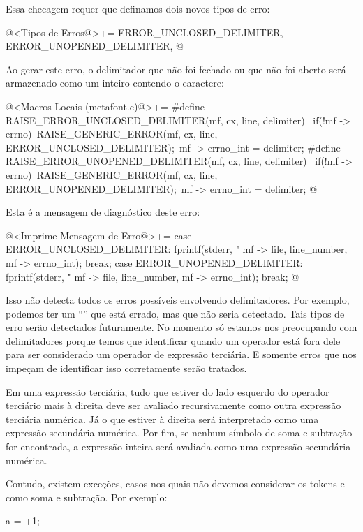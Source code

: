 Essa checagem requer que definamos dois novos tipos de erro:

\iniciocodigo
@<Tipos de Erros@>+=
ERROR_UNCLOSED_DELIMITER, ERROR_UNOPENED_DELIMITER,
@
\fimcodigo

Ao gerar este erro, o delimitador que não foi fechado ou que não foi
aberto será armazenado como um inteiro contendo o caractere:

\iniciocodigo
@<Macros Locais (metafont.c)@>+=
#define RAISE_ERROR_UNCLOSED_DELIMITER(mf, cx, line, delimiter) {\
  if(!mf -> errno){\
    RAISE_GENERIC_ERROR(mf, cx, line, ERROR_UNCLOSED_DELIMITER);\
    mf -> errno_int = delimiter;}}
#define RAISE_ERROR_UNOPENED_DELIMITER(mf, cx, line, delimiter) {\
  if(!mf -> errno){\
    RAISE_GENERIC_ERROR(mf, cx, line, ERROR_UNOPENED_DELIMITER);\
    mf -> errno_int = delimiter;}}
@
\fimcodigo

Esta é a mensagem de diagnóstico deste erro:

\iniciocodigo
@<Imprime Mensagem de Erro@>+=
case ERROR_UNCLOSED_DELIMITER:
  fprintf(stderr, "%
          mf -> file, line_number, mf -> errno_int);
  break;
case ERROR_UNOPENED_DELIMITER:
  fprintf(stderr, "%
          mf -> file, line_number, mf -> errno_int);
  break;
@
\fimcodigo

Isso não detecta todos os erros possíveis envolvendo
delimitadores. Por exemplo, podemos ter um ``\monoespaco{($\{$)$\}$}''
que está errado, mas que não seria detectado. Tais tipos de erro serão
detectados futuramente. No momento só estamos nos preocupando com
delimitadores porque temos que identificar quando um operador está
fora dele para ser considerado um operador de expressão terciária. E
somente erros que nos impeçam de identificar isso corretamente serão
tratados.

Em uma expressão terciária, tudo que estiver do lado esquerdo do
operador terciário mais à direita deve ser avaliado recursivamente
como outra expressão terciária numérica. Já o que estiver à direita
será interpretado como uma expressão secundária numérica. Por fim, se
nenhum símbolo de soma e subtração for encontrada, a expressão inteira
será avaliada como uma expressão secundária numérica.

Contudo, existem exceções, casos nos quais não devemos considerar os
tokens \monoespaco{+} e \monoespaco{-} como soma e subtração. Por
exemplo:

\alinhaverbatim
a = +1;
\alinhanormal


